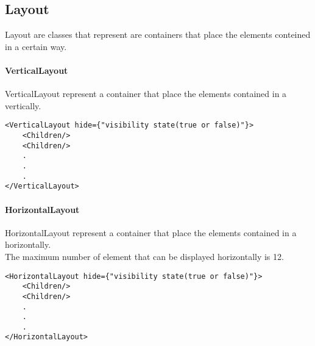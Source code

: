\subsection{Layout}
\begin{flushleft}
Layout are classes that represent are containers that place the elements conteined in a certain way.

\paragraph{VerticalLayout}
VerticalLayout represent a container that place the elements contained in a vertically.

\begin{verbatim}
<VerticalLayout hide={"visibility state(true or false)"}>
    <Children/>
    <Children/>
    .
    .
    .
</VerticalLayout>
\end{verbatim}

\paragraph{HorizontalLayout}
HorizontalLayout represent a container that place the elements contained in a horizontally.\\
The maximum number of element that can be displayed horizontally is 12.

\begin{verbatim}
<HorizontalLayout hide={"visibility state(true or false)"}>
    <Children/>
    <Children/>
    .
    .
    .
</HorizontalLayout>
\end{verbatim}
\end{flushleft}
